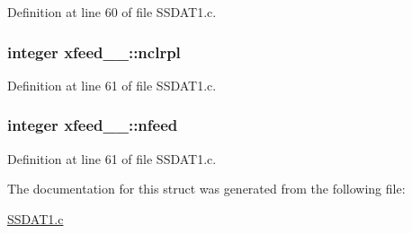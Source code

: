 Definition at line 60 of file S\+S\+D\+A\+T1.\+c.

\subsubsection[{\texorpdfstring{nclrpl}{nclrpl}}]{\setlength{\rightskip}{0pt plus 5cm}integer xfeed\+\_\+\_\+\+::nclrpl}\hypertarget{structxfeed__1___a21675a6e75a52325f906f2044f224839}{}\label{structxfeed__1___a21675a6e75a52325f906f2044f224839}


Definition at line 61 of file S\+S\+D\+A\+T1.\+c.

\subsubsection[{\texorpdfstring{nfeed}{nfeed}}]{\setlength{\rightskip}{0pt plus 5cm}integer xfeed\+\_\+\_\+\+::nfeed}\hypertarget{structxfeed__1___a11a22a65879076c641716c669ae94232}{}\label{structxfeed__1___a11a22a65879076c641716c669ae94232}


Definition at line 61 of file S\+S\+D\+A\+T1.\+c.



The documentation for this struct was generated from the following file\+:\begin{DoxyCompactItemize}
\item 
\hyperlink{SSDAT1_8c}{S\+S\+D\+A\+T1.\+c}\end{DoxyCompactItemize}
